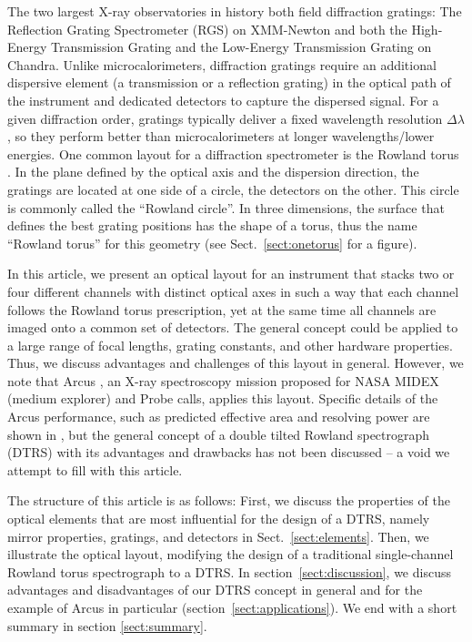 \documentclass[linenumbers]{aastex631}
\begin{document}
The two largest X-ray observatories in history both field diffraction gratings: The Reflection Grating Spectrometer (RGS) on XMM-Newton \citep{2001A&A...365L...7D} and both the High-Energy Transmission Grating  \citep[HETG,][]{2005PASP..117.1144C} and the Low-Energy Transmission Grating \citep[LETG,][]{1997SPIE.3113..172P} on Chandra.
Unlike microcalorimeters, diffraction gratings require an additional dispersive element (a transmission or a reflection grating) in the optical path of the instrument and dedicated detectors to capture the dispersed signal. For a given diffraction order, gratings typically deliver a fixed wavelength resolution $\Delta \lambda$, so they perform better than microcalorimeters at longer wavelengths/lower energies. One common layout for a diffraction spectrometer is the Rowland torus \citep{Beuermann:78}. In the plane defined by the optical axis and the dispersion direction, the gratings are located at one side of a circle, the detectors on the other. This circle is commonly called the ``Rowland circle''. In three dimensions, the surface that defines the best grating positions has the shape of a torus, thus the name ``Rowland torus'' for this geometry (see Sect.~\ref{sect:onetorus} for a figure).

In this article, we present an optical layout for an instrument that stacks two or four different channels with distinct optical axes in such a way that each channel follows the Rowland torus prescription, yet at the same time all channels are imaged onto a common set of detectors. The general concept could be applied to a large range of focal lengths, grating constants, and other hardware properties. Thus, we discuss advantages and challenges of this layout in general. However, we note that Arcus \citep{2023SPIE12678E..0ES}, an X-ray spectroscopy mission proposed for NASA MIDEX (medium explorer) and Probe calls, applies this layout. Specific details of the  Arcus performance, such as predicted effective area and resolving power are shown in \citet{2018SPIE10699E..6FG,2023SPIE12678E..1DG}, but the general concept of a double tilted Rowland spectrograph (DTRS) with its advantages and drawbacks has not been discussed -- a void we attempt to fill with this article.

The structure of this article is as follows: First, we discuss the properties of the optical elements that are most influential for the design of a DTRS, namely mirror properties, gratings, and detectors in Sect.~\ref{sect:elements}. Then, we illustrate the optical layout, modifying the design of a traditional single-channel Rowland torus spectrograph to a DTRS. In section~\ref{sect:discussion}, we discuss advantages and disadvantages of our DTRS concept in general and for the example of Arcus in particular (section~\ref{sect:applications}). We end with a short summary in section \ref{sect:summary}.
\end{document}
